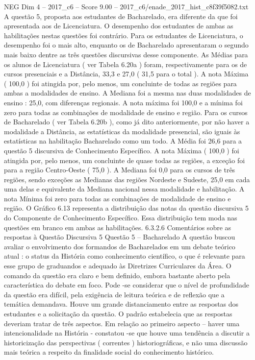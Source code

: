 \begin{textsample}{NEG Dim 4 – 2017\_c6 – Score 9.00 – 2017\_c6/enade\_2017\_hist\_c8f39f5082.txt}
A questão 5, proposta aos estudantes de Bacharelado, era diferente da que foi apresentada aos de Licenciatura.
O desempenho dos estudantes de ambas as habilitações nestas questões foi contrário.
Para os estudantes de Licenciatura, o desempenho foi o mais alto, enquanto os de Bacharelado apresentaram o segundo mais baixo dentre as três questões discursivas desse componente.
As Médias para os alunos de Licenciatura ( ver Tabela 6.20a ) foram, respectivamente para os de cursos presenciais e a Distância, 33,3 e 27,0 ( 31,5 para o total ).
A nota Máxima ( 100,0 ) foi atingida por, pelo menos, um concluinte de todas as regiões para ambas a modalidades de ensino.
A Mediana foi a mesma nas duas modalidades de ensino : 25,0, com diferenças regionais.
A nota máxima foi 100,0 e a mínima foi zero para todas as combinações de modalidade de ensino e região.
Para os cursos de Bacharelado ( ver Tabela 6.20b ), como já dito anteriormente, por não haver a modalidade a Distância, as estatísticas da modalidade presencial, são iguais às estatísticas na habilitação Bacharelado como um todo.
A Média foi 26,6 para a questão 5 discursiva de Conhecimento Específico.
A nota Máxima ( 100,0 ) foi atingida por, pelo menos, um concluinte de quase todas as regiões, a exceção foi para a região Centro-Oeste ( 75,0 ).
A Mediana foi 0,0 para os cursos de três regiões, sendo exceções as Medianas das regiões Nordeste e Sudeste, 25,0 em cada uma delas e equivalente da Mediana nacional nessa modalidade e habilitação.
A nota Mínima foi zero para todas as combinações de modalidade de ensino e região.
O Gráfico 6.13 representa a distribuição das notas da questão discursiva 5 do Componente de Conhecimento Específico.
Essa distribuição tem moda nas questões em branco em ambas as habilitações. 6.3.2.6 Comentários sobre as respostas à Questão Discursiva 5 Questão 5 – Bacharelado A questão buscou avaliar o envolvimento dos formandos de Bacharelados em um debate teórico atual : o status da História como conhecimento científico, o que é relevante para esse grupo de graduandos e adequado às Diretrizes Curriculares da Área.
O comando da questão era claro e bem definido, embora bastante aberto pela característica do debate em foco.
Pode -se considerar que o nível de profundidade da questão era difícil, pela exigência de leitura teórica e de reflexão que a temática demandava.
Houve um grande distanciamento entre as respostas dos estudantes e a solicitação da questão.
O padrão estabelecia que as respostas deveriam tratar de três aspectos.
Em relação ao primeiro aspecto – haver uma intencionalidade na História - constatou -se que houve uma tendência a discutir a historicização das perspectivas ( correntes ) historiográficas, e não uma discussão mais teórica a respeito da finalidade social do conhecimento histórico.

\end{textsample}
